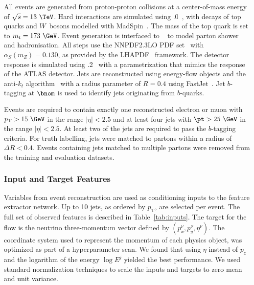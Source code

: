 All events are generated from proton-proton collisions at a center-of-mass energy of $\sqrt{s} = 13~\TeV$.
Hard interactions are simulated using .0~\cite{MadGraph}, with decays of top quarks and $W$~bosons modelled with MadSpin~\cite{MadSpin}.
The mass of the top quark is set to $m_t = 173~\GeV$.
Event generation is interfaced to ~\cite{Pythia8} to model parton shower and hadronisation.
All steps use the \textsc{NNPDF2.3LO} PDF set~\cite{PDF2.3} with $\alpha_S(m_Z) = 0.130$, as provided by the LHAPDF~\cite{LHAPDF6PartonDensity} framework.
The detector response is simulated using .2~\cite{Delphes} with a parametrization that mimics the response of the ATLAS detector.
Jets are reconstructed using energy-flow objects and the anti-$k_t$ algorithm~\cite{AntiKt} with a radius parameter of $R = 0.4$ using FastJet~\cite{FastJet}.
Jet $b$-tagging at $\bnom$ is used to identify jets originating from $b$-quarks.

Events are required to contain exactly one reconstructed electron or muon with $p_\mathrm{T} > 15~\GeV$ in the range $|\eta|<2.5$ and at least four jets with $\pt > 25~\GeV$ in the range $|\eta|<2.5$.
At least two of the jets are required to pass the $b$-tagging criteria.
For truth labelling, jets were matched to partons within a radius of $\Delta R < 0.4$.
Events containing jets matched to multiple partons were removed from the training and evaluation datasets.

\subsubsection{Input and Target Features}

Variables from event reconstruction are used as conditioning inputs to the feature extractor network.
Up to 10 jets, as ordered by $p_\mathrm{T}$, are selected per event.
The full set of observed features is described in Table~\ref{tab:inputs}.
The target for the flow is the neutrino three-momentum vector defined by $(p_x^\nu, p_y^\nu, \eta^\nu )$.
The coordinate system used to represent the momentum of each physics object, was optimized as part of a hyperparameter scan.
We found that using $\eta$ instead of $p_z$ and the logarithm of the energy $\log E^j$ yielded the best performance.
We used standard normalization techniques to scale the inputs and targets to zero mean and unit variance.

